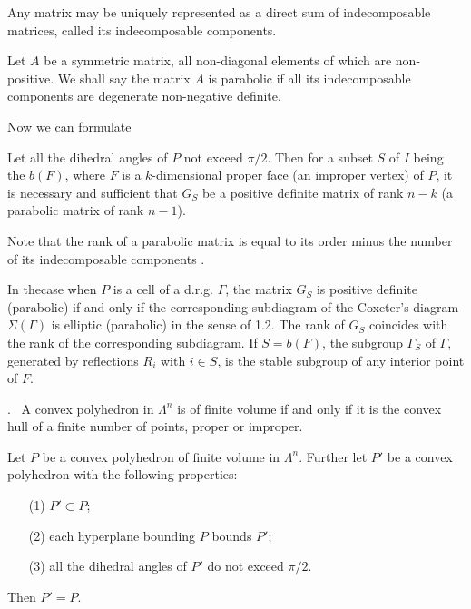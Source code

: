 Any matrix may be uniquely represented as a direct sum of indecomposable matrices, called its indecomposable components. 

Let $A$ be a symmetric matrix, all non-diagonal elements of which are non-positive. We shall say the matrix $A$ is parabolic if all its indecomposable components are degenerate non-negative definite.

Now we can formulate

\begin{theorem}\label{art10-thm2.3}
Let all the dihedral angles of $P$ not exceed $\pi/2$. Then for a subset $S$ of $I$ being the $b(F)$, where $F$ is a $k$-dimensional proper face (\resp an improper vertex) of $P$, it is necessary and sufficient that $G_S$ be a positive definite matrix of rank $n - k$ (\resp a parabolic matrix of rank $n -1$). 
\end{theorem}

Note that the rank of a parabolic matrix is equal to its order minus the number of its indecomposable components \cite{art10-key1}.

In the\pageoriginale case when $P$ is a cell of a d.r.g. $\Gamma$, the matrix $G_S$ is positive definite (\resp parabolic) if and only if the corresponding subdiagram of the Coxeter's diagram $\Sigma (\Gamma)$ is elliptic (\resp parabolic) in the sense of 1.2. The rank of $G_S$ coincides with the rank of the corresponding subdiagram. If $S = b(F)$, the subgroup $\Gamma_S$ of $\Gamma$, generated by reflections $R_i$ with $i \in S$, is the stable subgroup of any interior point of $F$.


.~ A convex polyhedron in $\Lambda^n$ is of finite volume if and only if it is the convex hull of a finite number of points, proper or improper. 

\setcounter{lemma}{3}
\begin{lemma}\label{art10-lem2.4}
Let $P$ be a convex polyhedron of finite volume in $\Lambda^n$. Further let $P'$ be a convex polyhedron with the following properties:
\begin{itemize}
\item[(1)] $P' \subset P$;

\item[(2)] each hyperplane bounding $P$ bounds $P'$;

\item[(3)] all the dihedral angles of $P'$ do not exceed $\pi/2$.
\end{itemize}
Then $P'=P$.
\end{lemma}

